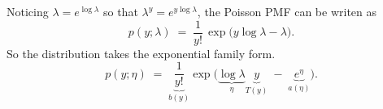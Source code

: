 \begin{answer}

Noticing $\lambda=e^{\log{\lambda}}$ so that $\lambda^y=e^{y\log{\lambda}}$, the Poisson PMF can be writen as
\[
p(y;\lambda) \;=\; \frac{1}{y!}\,\exp\!\Big(y\log\lambda - \lambda\Big).
\]
So the distribution takes the exponential family form.
\[
p(y;\eta) \;=\; \underbrace{\frac{1}{y!}}_{b(y)} \exp\!\Big(\underbrace{\log\lambda}_{\eta}\underbrace{y}_{T(y)} \;-\; \underbrace{e^{\eta}}_{a(\eta)}\Big).
\]
\end{answer}
